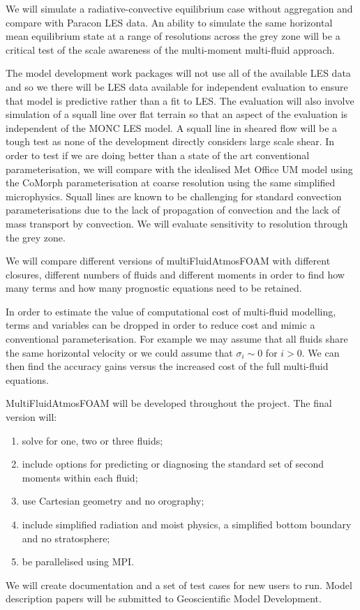 \documentclass[11pt,a4paper]{article}
\begin{document}
We will simulate a radiative-convective equilibrium case without aggregation and compare with Paracon LES data. An ability to simulate the same horizontal mean equilibrium state at a range of resolutions across the grey zone will be a critical test of the scale awareness of the multi-moment multi-fluid approach.


The model development work packages will not use all of the available LES data and so we there will be LES data available for independent evaluation to ensure that model is predictive rather than a fit to LES. The evaluation will also involve simulation of a squall line over flat terrain \cite[]{FM06} so that an aspect of the evaluation is independent of the MONC LES model. A squall line in sheared flow will be a tough test as none of the development directly considers large scale shear. In order to test if we are doing better than a state of the art conventional parameterisation, we will compare with the idealised Met Office UM model using the CoMorph parameterisation at coarse resolution using the same simplified microphysics. Squall lines are known to be challenging for standard convection parameterisations \cite[e.g.][]{LCD+08} due to the lack of propagation of convection and the lack of mass transport by convection. We will evaluate sensitivity to resolution through the grey zone. 

We will compare different versions of multiFluidAtmosFOAM with different closures, different numbers of fluids and different moments in order to find how many terms and how many prognostic equations need to be retained. 

In order to estimate the value of computational cost of multi-fluid modelling, terms and variables can be dropped in order to reduce cost and mimic a conventional parameterisation. For example we may assume that all fluids share the same horizontal velocity or we could assume that $\sigma_i\sim 0$ for $i>0$. We can then find the accuracy gains versus the increased cost of the full multi-fluid equations.


MultiFluidAtmosFOAM will be developed throughout the project. The final version will:
\begin{enumerate}
\item solve for one, two or three fluids;
\item include options for predicting or diagnosing the standard set of second moments within each fluid;
\item use Cartesian geometry and no orography;
\item include simplified radiation and moist physics, a simplified bottom boundary and no stratosphere;
\item be parallelised using MPI.
\end{enumerate}
We will create documentation and a set of test cases for new users to run. Model description papers will be submitted to Geoscientific Model Development.
\end{document}
